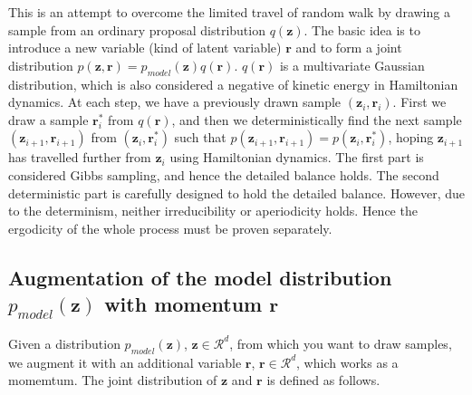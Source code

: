 \documentclass[a4]{article}
\begin{document}
This is an attempt to overcome the limited travel of random walk by drawing a sample from an ordinary proposal distribution $q(\bm{z})$.
The basic idea is to introduce a new variable (kind of latent variable) $\bm{r}$ and to form a joint distribution 
$p(\bm{z}, \bm{r}) = p_{model}(\bm{z}) q(\bm{r})$. $q(\bm{r})$ is a multivariate Gaussian distribution, which is also considered a
negative of kinetic energy in Hamiltonian dynamics.
At each step, we have a previously drawn sample $(\bm{z}_i, \bm{r}_i)$.
First we draw a sample $\bm{r}_i^*$ from $q(\bm{r})$, and then we deterministically find the next sample 
$(\bm{z}_{i+1}, \bm{r}_{i+1})$ from $(\bm{z}_{i}, \bm{r}_{i}^*)$ such that 
$p(\bm{z}_{i+1}, \bm{r}_{i+1}) = p(\bm{z}_{i}, \bm{r}_{i}^*)$, hoping $\bm{z}_{i+1}$ has travelled further from $\bm{z}_i$
using Hamiltonian dynamics.
The first part is considered Gibbs sampling, and hence the detailed balance holds.
The second deterministic part is carefully designed to hold the detailed balance.
However, due to the determinism, neither irreducibility or aperiodicity holds.
Hence the ergodicity of the whole process must be proven separately.


\subsection{Augmentation of the model distribution $p_{model}(\bm{z})$ with momentum $\bm{r}$}
Given a distribution $p_{model}(\bm{z})$, $\bm{z} \in \mathcal{R}^d$,  from which you want to draw samples, we augment
it with an additional variable $\bm{r}$, $\bm{r} \in \mathcal{R}^d$, which works as a momemtum. The joint distribution of $\bm{z}$ and
$\bm{r}$ is defined as follows.
\end{document}
